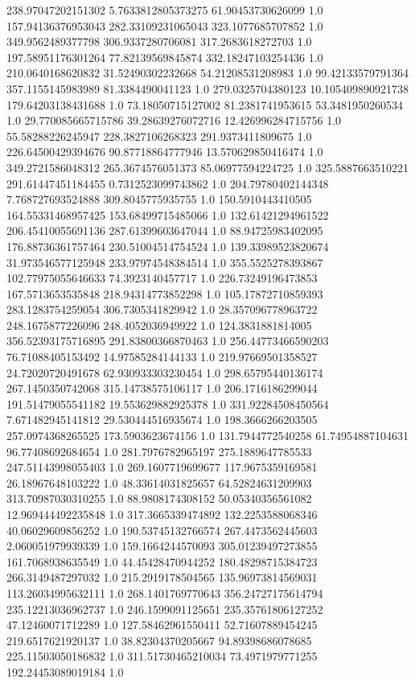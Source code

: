 238.97047202151302	5.7633812805373275	61.90453730626099	1.0
157.94136376953043	282.33109231065043	323.1077685707852	1.0
349.9562489377798	306.9337280706081	317.2683618272703	1.0
197.58951176301264	77.82139569845874	332.18247103254436	1.0
210.0640168620832	31.52490302232668	54.21208531208983	1.0
99.42133579791364	357.1155145983989	81.3384490041123	1.0
279.0325704380123	10.105409890921738	179.64203138431688	1.0
73.18050715127002	81.2381741953615	53.3481950260534	1.0
29.770085665715786	39.28639276072716	12.426996284715756	1.0
55.58288226245947	228.3827106268323	291.9373411809675	1.0
226.64500429394676	90.87718864777946	13.570629850416474	1.0
349.2721586048312	265.3674576051373	85.06977594224725	1.0
325.5887663510221	291.61447451184455	0.7312523099743862	1.0
204.79780402144348	7.768727693524888	309.8045775935755	1.0
150.5910443410505	164.55331468957425	153.68499715485066	1.0
132.61421294961522	206.45410055691136	287.61399603647044	1.0
88.94725983402095	176.88736361757464	230.51004514754524	1.0
139.33989523820674	31.973546577125948	233.97974548384514	1.0
355.5525278393867	102.77975055646633	74.3923140457717	1.0
226.73249196473853	167.5713653535848	218.94314773852298	1.0
105.17872710859393	283.1283754259054	306.7305341829942	1.0
28.357096778963722	248.1675877226096	248.4052036949922	1.0
124.3831881814005	356.52393175716895	291.83800366870463	1.0
256.44773466590203	76.71088405153492	14.97585284144133	1.0
219.97669501358527	24.72020720491678	62.930933303230454	1.0
298.65795440136174	267.1450350742068	315.14738575106117	1.0
206.1716186299044	191.51479055541182	19.553629882925378	1.0
331.92284508450564	7.671482945141812	29.530444516935674	1.0
198.3666266203505	257.0974368265525	173.5903623674156	1.0
131.7944772540258	61.74954887104631	96.77408692684654	1.0
281.7976782965197	275.1889647785533	247.51143998055403	1.0
269.1607719699677	117.9675359169581	26.18967648103222	1.0
48.33614031825657	64.52824631209903	313.70987030310255	1.0
88.9808174308152	50.05340356561082	12.969444492235848	1.0
317.3665339474892	132.2253588068346	40.06029609856252	1.0
190.53745132766574	267.4473562445603	2.060051979939339	1.0
159.1664244570093	305.01239497273855	161.7068938635549	1.0
44.45428470944252	180.48298715384723	266.3149487297032	1.0
215.2919178504565	135.96973814569031	113.26034995632111	1.0
268.1401769770643	356.24727175614794	235.12213036962737	1.0
246.1599091125651	235.35761806127252	47.12460071712289	1.0
127.58462961550411	52.71607889454245	219.6517621920137	1.0
38.82304370205667	94.89398686078685	225.11503050186832	1.0
311.51730465210034	73.4971979771255	192.24453089019184	1.0
